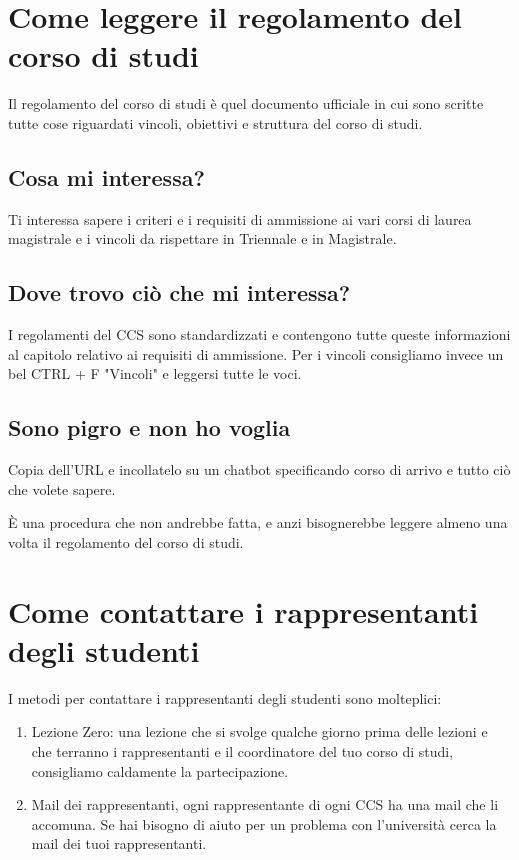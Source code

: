 \documentclass[legal]{polinetwork}
\begin{document}
\section{Come leggere il regolamento del corso di studi}


Il regolamento del corso di studi è quel documento ufficiale in cui sono scritte tutte cose riguardati vincoli, obiettivi e struttura del corso di studi.

\subsection{Cosa mi interessa?}


Ti interessa sapere i criteri e i requisiti di ammissione ai vari corsi di laurea magistrale e i vincoli da rispettare in Triennale e in Magistrale.

\subsection{Dove trovo ciò che mi interessa?}


I regolamenti del CCS sono standardizzati e contengono tutte queste informazioni al capitolo relativo ai requisiti di ammissione. Per i vincoli consigliamo invece un bel CTRL + F "Vincoli" e leggersi tutte le voci.

\subsection{Sono pigro e non ho voglia}


Copia dell'URL e incollatelo su un chatbot specificando corso di arrivo e tutto ciò che volete sapere.

È una procedura che non andrebbe fatta, e anzi bisognerebbe leggere almeno una volta il regolamento del corso di studi.

\section{Come contattare i rappresentanti degli studenti}


I metodi per contattare i rappresentanti degli studenti sono molteplici:

\begin{enumerate}
  \item Lezione Zero: una lezione che si svolge qualche giorno prima delle lezioni e che terranno i rappresentanti e il coordinatore del tuo corso di studi, consigliamo caldamente la partecipazione.
  \item Mail dei rappresentanti, ogni rappresentante di ogni CCS ha una mail che li accomuna. Se hai bisogno di aiuto per un problema con l'università cerca la mail dei tuoi rappresentanti.
\end{enumerate}
\end{document}
